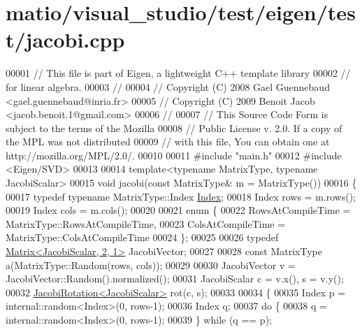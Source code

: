 \hypertarget{matio_2visual__studio_2test_2eigen_2test_2jacobi_8cpp_source}{}\section{matio/visual\+\_\+studio/test/eigen/test/jacobi.cpp}
\label{matio_2visual__studio_2test_2eigen_2test_2jacobi_8cpp_source}

\begin{DoxyCode}
00001 \textcolor{comment}{// This file is part of Eigen, a lightweight C++ template library}
00002 \textcolor{comment}{// for linear algebra.}
00003 \textcolor{comment}{//}
00004 \textcolor{comment}{// Copyright (C) 2008 Gael Guennebaud <gael.guennebaud@inria.fr>}
00005 \textcolor{comment}{// Copyright (C) 2009 Benoit Jacob <jacob.benoit.1@gmail.com>}
00006 \textcolor{comment}{//}
00007 \textcolor{comment}{// This Source Code Form is subject to the terms of the Mozilla}
00008 \textcolor{comment}{// Public License v. 2.0. If a copy of the MPL was not distributed}
00009 \textcolor{comment}{// with this file, You can obtain one at http://mozilla.org/MPL/2.0/.}
00010 
00011 \textcolor{preprocessor}{#include "main.h"}
00012 \textcolor{preprocessor}{#include <Eigen/SVD>}
00013 
00014 \textcolor{keyword}{template}<\textcolor{keyword}{typename} MatrixType, \textcolor{keyword}{typename} JacobiScalar>
00015 \textcolor{keywordtype}{void} jacobi(\textcolor{keyword}{const} MatrixType& m = MatrixType())
00016 \{
00017   \textcolor{keyword}{typedef} \textcolor{keyword}{typename} MatrixType::Index \hyperlink{namespace_eigen_a62e77e0933482dafde8fe197d9a2cfde}{Index};
00018   Index rows = m.rows();
00019   Index cols = m.cols();
00020 
00021   \textcolor{keyword}{enum} \{
00022     RowsAtCompileTime = MatrixType::RowsAtCompileTime,
00023     ColsAtCompileTime = MatrixType::ColsAtCompileTime
00024   \};
00025 
00026   \textcolor{keyword}{typedef} \hyperlink{group___core___module_class_eigen_1_1_matrix}{Matrix<JacobiScalar, 2, 1>} JacobiVector;
00027 
00028   \textcolor{keyword}{const} MatrixType a(MatrixType::Random(rows, cols));
00029 
00030   JacobiVector v = JacobiVector::Random().normalized();
00031   JacobiScalar c = v.x(), s = v.y();
00032   \hyperlink{group___jacobi___module_class_eigen_1_1_jacobi_rotation}{JacobiRotation<JacobiScalar>} rot(c, s);
00033 
00034   \{
00035     Index p = internal::random<Index>(0, rows-1);
00036     Index q;
00037     \textcolor{keywordflow}{do} \{
00038       q = internal::random<Index>(0, rows-1);
00039     \} \textcolor{keywordflow}{while} (q == p);

\end{DoxyCode}
